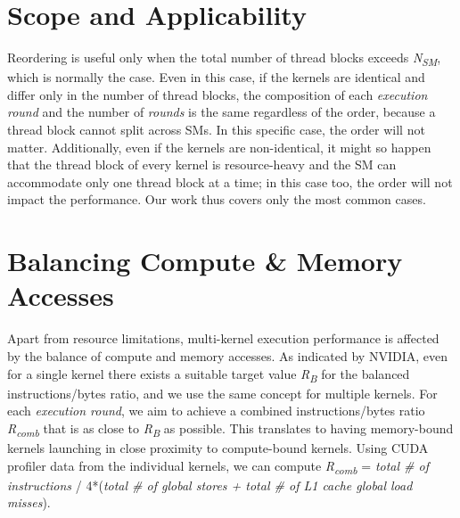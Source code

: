 \documentclass[twocolumn]{el-author}
\begin{document}
\section{Scope and Applicability} 
Reordering is useful only when the total number of thread blocks exceeds \emph{N\textsubscript{SM}}, which is normally the case.  
Even in this case, 
if the kernels are identical and differ only in the number of thread blocks, the composition of each \emph{execution round} and the number of \emph{rounds} is the same regardless of the order, because a thread block cannot split across SMs.  In this specific case, the order will not matter.   
Additionally, even if the kernels are non-identical, it might so happen that the thread block of every kernel is resource-heavy and the SM can accommodate only 
one thread block at a time; in this case too, the order will not impact the performance.  Our work thus covers only the most common cases.  





\section{Balancing Compute \& Memory Accesses} 
Apart from resource limitations, multi-kernel execution performance is affected by the balance of compute and memory accesses.  As indicated by NVIDIA,
even for a single kernel there exists a suitable target value \emph{R\textsubscript{B}} for the balanced instructions/bytes ratio, and we use the same concept for multiple kernels. 
For each \emph{execution round}, we aim to achieve a combined instructions/bytes ratio \emph{R\textsubscript{comb}} that is as close to \emph{R\textsubscript{B}} as possible.  This translates
to having memory-bound kernels launching in close proximity to compute-bound kernels. Using CUDA profiler data from the individual kernels, we can compute 
\emph{R\textsubscript{comb}} = \emph{total \# of instructions} / 4*(\emph{total \# of global stores + total \# of L1 cache global load misses}). 
\end{document}
